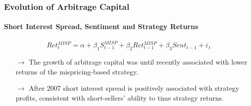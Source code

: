\documentclass{beamer}
\begin{document}
\begin{frame}
\frametitle{Evolution of Arbitrage Capital}
\framesubtitle{Short Interest Spread, Sentiment and Strategy Returns}
\vspace*{-0.4cm}
		\begin{equation} \nonumber
Ret^{MISP}_{t} = \alpha+\beta_1  S^{MISP}_{t-1}  + \beta_2 Ret^{MISP}_{t-1} + \beta_3 Sent_{t-1} + \varepsilon_{t}
\end{equation}
\vspace*{-1cm}
\begin{table}[htbp]
  \centering
  \footnotesize
  	  \resizebox{\textwidth}{!}{	 	
	 	
	\label{tab:misp_ret_breaks}%
	}
\end{table}
\begin{itemize}
\item[$\rightarrow$]The growth of arbitrage capital was until recently associated with lower returns of the mispricing-based strategy.
\item[$\rightarrow$] After 2007 short interest spread is positively associated with strategy profits, consistent with short-sellers' ability to time strategy returns.

\end{itemize}
	\end{frame}
\end{document}
